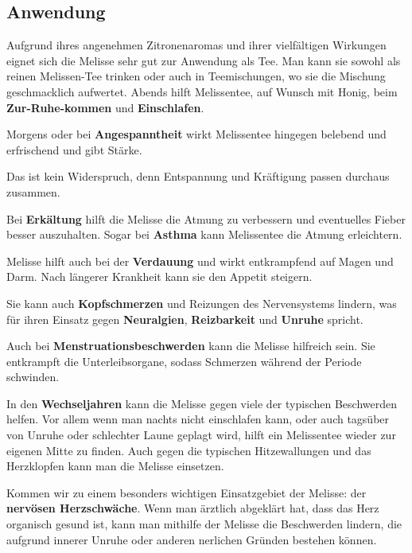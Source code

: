            


\subsection{Anwendung}

Aufgrund ihres angenehmen Zitronenaromas und ihrer vielfältigen Wirkungen eignet sich die Melisse sehr gut zur Anwendung als Tee. Man kann sie sowohl als reinen Melissen-Tee trinken oder auch in Teemischungen, wo sie die Mischung geschmacklich aufwertet.
Abends hilft Melissentee, auf Wunsch mit Honig, beim \textbf{Zur-Ruhe-kommen} und \textbf{Einschlafen}.

Morgens oder bei \textbf{Angespanntheit} wirkt Melissentee hingegen belebend und erfrischend und gibt Stärke.

Das ist kein Widerspruch, denn Entspannung und Kräftigung passen durchaus zusammen.

Bei \textbf{Erkältung} hilft die Melisse die Atmung zu verbessern und eventuelles Fieber besser auszuhalten. Sogar bei \textbf{Asthma} kann Melissentee die Atmung erleichtern.

Melisse hilft auch bei der \textbf{Verdauung} und wirkt entkrampfend auf Magen und Darm. Nach längerer Krankheit kann sie den Appetit steigern.

Sie kann auch \textbf{Kopfschmerzen} und Reizungen des Nervensystems lindern, was für ihren Einsatz gegen \textbf{Neuralgien}, \textbf{Reizbarkeit} und \textbf{Unruhe} spricht.

Auch bei \textbf{Menstruationsbeschwerden} kann die Melisse hilfreich sein. Sie entkrampft die Unterleibsorgane, sodass Schmerzen während der Periode schwinden.

In den \textbf{Wechseljahren} kann die Melisse gegen viele der typischen Beschwerden helfen. Vor allem wenn man nachts nicht einschlafen kann, oder auch tagsüber von Unruhe oder schlechter Laune geplagt wird, hilft ein Melissentee wieder zur eigenen Mitte zu finden. Auch gegen die typischen Hitzewallungen und das Herzklopfen kann man die Melisse einsetzen.

Kommen wir zu einem besonders wichtigen Einsatzgebiet der Melisse: der \textbf{nervösen Herzschwäche}. Wenn man ärztlich abgeklärt hat, dass das Herz organisch gesund ist, kann man mithilfe der Melisse die Beschwerden lindern, die aufgrund innerer Unruhe oder anderen nerlichen Gründen bestehen können.

